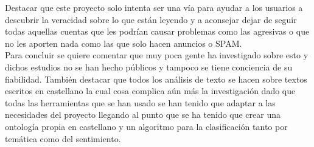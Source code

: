 \documentclass[../all.tex]{subfiles}
\begin{document}
    Destacar que este proyecto solo intenta ser una vía para ayudar a los usuarios a descubrir la veracidad sobre lo que están leyendo y a aconsejar dejar de seguir todas aquellas cuentas que les podrían causar problemas como las agresivas o que no les aporten nada como las que solo hacen anuncios o SPAM.\\
    \newpage
    Para concluir se quiere comentar que muy poca gente ha investigado sobre esto y dichos estudios no se han hecho públicos y tampoco se tiene conciencia de su fiabilidad. También destacar que todos los análisis de texto se hacen sobre textos escritos en castellano la cual cosa complica aún más la investigación dado que todas las herramientas que se han usado se han tenido que adaptar a las necesidades del proyecto llegando al punto que se ha tenido que crear una ontología propia en castellano y un algoritmo para la clasificación tanto por temática como del sentimiento. 
    

\end{document}
